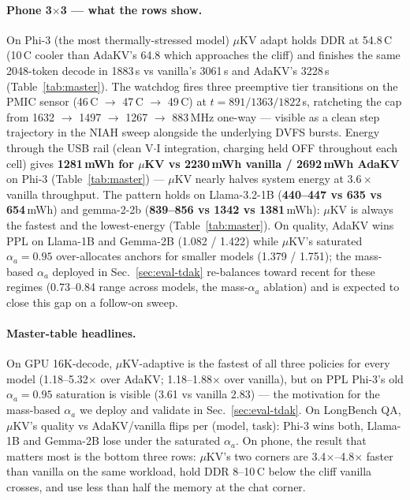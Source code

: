 \documentclass[sigconf, anonymous=false, screen=true]{acmart}
\begin{document}
\paragraph{Phone 3$\times$3 — what the rows show.}
On Phi-3 (the most thermally-stressed model) $\mu$KV adapt holds DDR at 54.8\,\textdegree C (10\,\textdegree C cooler than AdaKV's 64.8 which approaches the cliff) and finishes the same 2048-token decode in 1883\,s vs vanilla's 3061\,s and AdaKV's 3228\,s (Table~\ref{tab:master}). The watchdog fires three preemptive tier transitions on the PMIC sensor (46\,\textdegree C $\to$ 47\,\textdegree C $\to$ 49\,\textdegree C) at $t{=}891/1363/1822$\,s, ratcheting the cap from 1632 $\to$ 1497 $\to$ 1267 $\to$ 883\,MHz one-way --- visible as a clean step trajectory in the NIAH sweep alongside the underlying DVFS bursts. Energy through the USB rail (clean V$\cdot$I integration, charging held OFF throughout each cell) gives \textbf{1281\,mWh for $\mu$KV vs 2230\,mWh vanilla / 2692\,mWh AdaKV} on Phi-3 (Table~\ref{tab:master}) --- $\mu$KV nearly halves system energy at $3.6\times$ vanilla throughput. The pattern holds on Llama-3.2-1B (\textbf{440--447 vs 635 vs 654}\,mWh) and gemma-2-2b (\textbf{839--856 vs 1342 vs 1381}\,mWh): $\mu$KV is always the fastest and the lowest-energy (Table~\ref{tab:master}). On quality, AdaKV wins PPL on Llama-1B and Gemma-2B (1.082 / 1.422) while $\mu$KV's saturated $\alpha_a{=}0.95$ over-allocates anchors for smaller models (1.379 / 1.751); the mass-based $\alpha_a$ deployed in Sec.~\ref{sec:eval-tdak} re-balances toward recent for these regimes (0.73--0.84 range across models, the mass-$\alpha_a$ ablation) and is expected to close this gap on a follow-on sweep.


\paragraph{Master-table headlines.}
On GPU 16K-decode, $\mu$KV-adaptive is the fastest of all three policies for every model (1.18--5.32$\times$ over AdaKV; 1.18--1.88$\times$ over vanilla), but on PPL Phi-3's old $\alpha_a{=}0.95$ saturation is visible (3.61 vs vanilla 2.83) --- the motivation for the mass-based $\alpha_a$ we deploy and validate in Sec.~\ref{sec:eval-tdak}. On LongBench QA, $\mu$KV's quality vs AdaKV/vanilla flips per (model, task): Phi-3 wins both, Llama-1B and Gemma-2B lose under the saturated $\alpha_a$. On phone, the result that matters most is the bottom three rows: $\mu$KV's two corners are 3.4$\times$--4.8$\times$ faster than vanilla on the same workload, hold DDR 8--10\,\textdegree C below the cliff vanilla crosses, and use less than half the memory at the chat corner.
\end{document}

